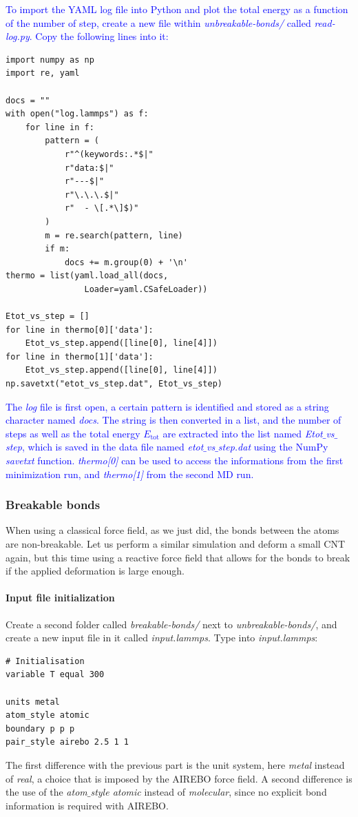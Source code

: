 \documentclass[9pt,tutorial]{livecoms}
\begin{document}
\textcolor{blue}{To import the YAML log file into Python and plot the total energy as a function of the number of step, create a new file within \textit{unbreakable-bonds/} called \textit{read-log.py}. Copy the following lines into it:}
{\normalsize \begin{verbatim}
import numpy as np
import re, yaml

docs = ""
with open("log.lammps") as f:
    for line in f:
        pattern = (
            r"^(keywords:.*$|"
            r"data:$|"
            r"---$|"
            r"\.\.\.$|"
            r"  - \[.*\]$)"
        )
        m = re.search(pattern, line)
        if m:
            docs += m.group(0) + '\n'
thermo = list(yaml.load_all(docs,
                Loader=yaml.CSafeLoader))

Etot_vs_step = []
for line in thermo[0]['data']:
    Etot_vs_step.append([line[0], line[4]])
for line in thermo[1]['data']:
    Etot_vs_step.append([line[0], line[4]])
np.savetxt("etot_vs_step.dat", Etot_vs_step)
\end{verbatim}}
\textcolor{blue}{The \textit{log} file is first open, a certain pattern is identified and stored as a string character named \textit{docs}. The string is then converted in a list, and the number of steps as well as the total energy $E_\text{tot}$ are extracted into the list named \textit{Etot$\_$vs$\_$step}, which is saved in the data file named \textit{etot$\_$vs$\_$step.dat} using the NumPy \textit{savetxt} function. \textit{thermo[0]} can be used to access the informations from the first minimization run, and  \textit{thermo[1]} from the second MD run.}

\subsubsection{Breakable bonds}
When using a classical force field, as we just did, the bonds between the atoms are non-breakable. Let us perform a similar simulation and deform a small CNT again, but this time using a reactive force field that allows for the bonds to break if the applied deformation is large enough.

\paragraph{Input file initialization}
\noindent Create a second folder called \textit{breakable-bonds/} next to \textit{unbreakable-bonds/}, and create a new input file in it called \textit{input.lammps}. Type into \textit{input.lammps}:
{\normalsize \begin{verbatim}
# Initialisation
variable T equal 300

units metal
atom_style atomic
boundary p p p
pair_style airebo 2.5 1 1
\end{verbatim}}
The first difference with the previous part is the unit system, here \textit{metal} instead of \textit{real}, a choice that is imposed by the AIREBO force field. A second difference is the use of the \textit{atom$\_$style atomic} instead of \textit{molecular}, since no explicit bond information is required with AIREBO.
\end{document}
